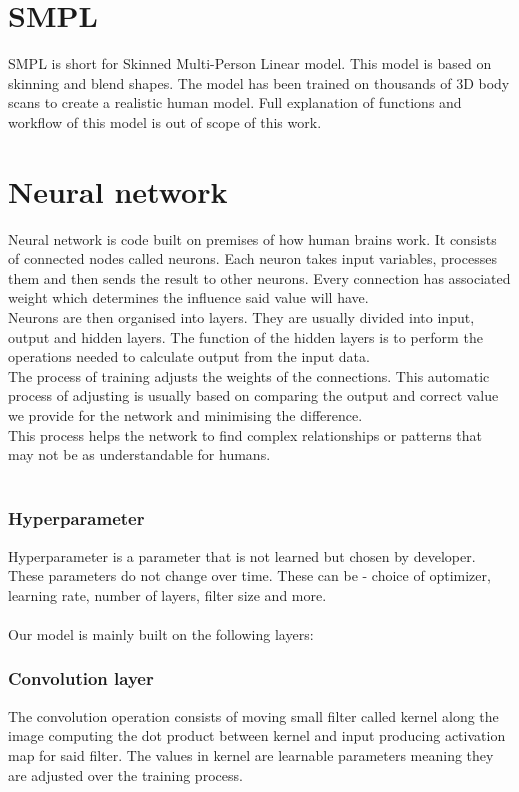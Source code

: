 \section{SMPL}
SMPL is short for Skinned Multi-Person Linear model. This model is based on skinning and blend shapes. The model has been trained on thousands of 3D body scans to create a realistic human model. Full explanation of functions and workflow of this model is out of scope of this work.

\section{Neural network}
Neural network is code built on premises of how human brains work. It consists of connected nodes called neurons. Each neuron takes input variables, processes them and then sends the result to other neurons. Every connection has associated weight which determines the influence said value will have.\\
Neurons are then organised into layers. They are usually divided into input, output and hidden layers. The function of the hidden layers is to perform the operations needed to calculate output from the input data.\\
The process of training adjusts the weights of the connections. This automatic process of adjusting is usually based on comparing the output and correct value we provide for the network and minimising the difference.\\
This process helps the network to find complex relationships or patterns that may not  be as understandable for humans. \\\\

\subsubsection{Hyperparameter}
Hyperparameter is a parameter that is not learned but chosen by developer.  These parameters do not change over time. These can be - choice of optimizer, learning rate,  number of layers, filter size and more.\\\\
Our model is mainly built on the following layers:
\subsubsection{Convolution layer}
The convolution operation consists of moving small filter called kernel along the image computing the dot product between kernel and input producing activation map for said filter.  The values in kernel are learnable parameters meaning they are adjusted over the training process.
